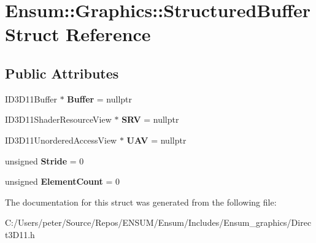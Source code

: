 \hypertarget{struct_ensum_1_1_graphics_1_1_structured_buffer}{}\section{Ensum\+:\+:Graphics\+:\+:Structured\+Buffer Struct Reference}
\label{struct_ensum_1_1_graphics_1_1_structured_buffer}
\subsection*{Public Attributes}
\begin{DoxyCompactItemize}
\item 
I\+D3\+D11\+Buffer $\ast$ {\bfseries Buffer} = nullptr\hypertarget{struct_ensum_1_1_graphics_1_1_structured_buffer_a71cd7a627a1d3c6dd9406d6902c6bcc1}{}\label{struct_ensum_1_1_graphics_1_1_structured_buffer_a71cd7a627a1d3c6dd9406d6902c6bcc1}

\item 
I\+D3\+D11\+Shader\+Resource\+View $\ast$ {\bfseries S\+RV} = nullptr\hypertarget{struct_ensum_1_1_graphics_1_1_structured_buffer_a7f169a11451ed8783f93e08921cdf141}{}\label{struct_ensum_1_1_graphics_1_1_structured_buffer_a7f169a11451ed8783f93e08921cdf141}

\item 
I\+D3\+D11\+Unordered\+Access\+View $\ast$ {\bfseries U\+AV} = nullptr\hypertarget{struct_ensum_1_1_graphics_1_1_structured_buffer_accc2db7ce60d7d51832c3da3225bce52}{}\label{struct_ensum_1_1_graphics_1_1_structured_buffer_accc2db7ce60d7d51832c3da3225bce52}

\item 
unsigned {\bfseries Stride} = 0\hypertarget{struct_ensum_1_1_graphics_1_1_structured_buffer_a006c6f374dd1e046a97c444cf182ff4d}{}\label{struct_ensum_1_1_graphics_1_1_structured_buffer_a006c6f374dd1e046a97c444cf182ff4d}

\item 
unsigned {\bfseries Element\+Count} = 0\hypertarget{struct_ensum_1_1_graphics_1_1_structured_buffer_a3a508d28e2eeb7ef69cc467080b22807}{}\label{struct_ensum_1_1_graphics_1_1_structured_buffer_a3a508d28e2eeb7ef69cc467080b22807}

\end{DoxyCompactItemize}


The documentation for this struct was generated from the following file\+:\begin{DoxyCompactItemize}
\item 
C\+:/\+Users/peter/\+Source/\+Repos/\+E\+N\+S\+U\+M/\+Ensum/\+Includes/\+Ensum\+\_\+graphics/Direct3\+D11.\+h\end{DoxyCompactItemize}
